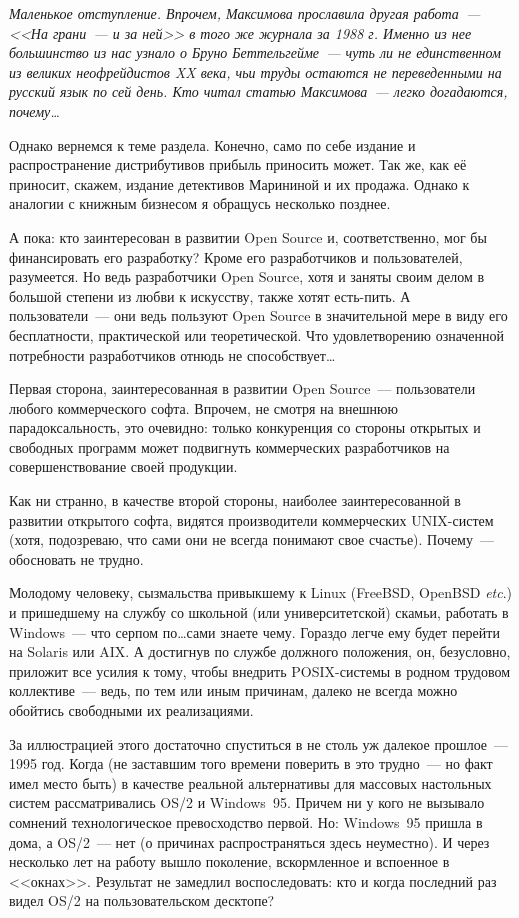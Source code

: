 \textit{Маленькое отступление. Впрочем, Максимова прославила другая работа~--- <<На грани~--- и за ней>> в  того же журнала за 1988 г. Именно из нее большинство из нас узнало о Бруно Беттельгейме~--- чуть ли не единственном из великих неофрейдистов XX века, чьи труды остаются не переведенными на русский язык по сей день. Кто читал статью Максимова~--- легко догадаются, почему\dots}


Однако вернемся к теме раздела. Конечно, само по себе издание и распространение дистрибутивов прибыль приносить может. Так же, как её приносит, скажем, издание детективов Марининой и их продажа. Однако к аналогии с книжным бизнесом я обращусь несколько позднее.

А пока: кто заинтересован в развитии Open Source и, соответственно, мог бы финансировать его разработку? Кроме его разработчиков и пользователей, разумеется. Но ведь разработчики Open Source, хотя и заняты своим делом в большой степени из любви к искусству, также хотят есть-пить. А пользователи~--- они ведь пользуют Open Source в значительной мере в виду его бесплатности, практической или теоретической. Что удовлетворению означенной потребности разработчиков отнюдь не способствует\dots

Первая сторона, заинтересованная в развитии Open Source~--- пользователи любого коммерческого софта. Впрочем, не смотря на внешнюю парадоксальность, это очевидно: только конкуренция со стороны открытых и свободных программ может подвигнуть коммерческих разработчиков на совершенствование своей продукции.

Как ни странно, в качестве второй стороны, наиболее заинтересованной в развитии открытого софта, видятся производители коммерческих UNIX-систем (хотя, подозреваю, что сами они не всегда понимают свое счастье). Почему~--- обосновать не трудно.

Молодому человеку, сызмальства привыкшему к Linux (FreeBSD, OpenBSD \textit{etc}.) и пришедшему на службу со школьной (или университетской) скамьи, работать в Windows~--- что серпом по\dots сами знаете чему. Гораздо легче ему будет перейти на Solaris или AIX. А достигнув по службе должного положения, он, безусловно, приложит все усилия к тому, чтобы внедрить POSIX-системы в родном трудовом коллективе~--- ведь, по тем или иным причинам, далеко не всегда можно обойтись свободными их реализациями.

За иллюстрацией этого достаточно спуститься в не столь уж далекое прошлое~--- 1995 год. Когда (не заставшим того времени поверить в это трудно~--- но факт имел место быть) в качестве реальной альтернативы для массовых настольных систем рассматривались OS/2 и Windows~95. Причем ни у кого не вызывало сомнений технологическое превосходство первой. Но: Windows~95 пришла в дома, а OS/2~--- нет (о причинах распространяться здесь неуместно). И через несколько лет на работу вышло поколение, вскормленное и вспоенное в <<окнах>>. Результат не замедлил воспоследовать: кто и когда последний раз видел OS/2 на пользовательском десктопе?

